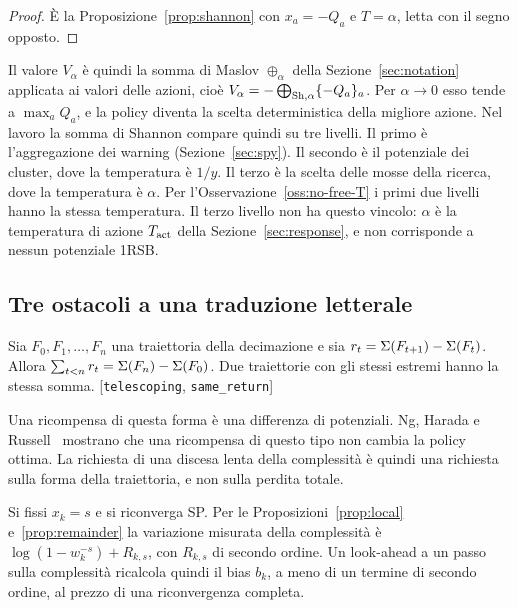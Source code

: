 \begin{proof}
È la Proposizione~\ref{prop:shannon} con $x_a=-Q_a$ e $T=\alpha$, letta con il segno opposto.
\end{proof}

Il valore $V_\alpha$ è quindi la somma di Maslov $\oplus_\alpha$ della Sezione~\ref{sec:notation} applicata ai valori delle azioni, cioè $V_\alpha=-\bigoplus_{\mathrm{Sh},\alpha}\{-Q_a\}_a$.
Per $\alpha\to0$ esso tende a $\max_aQ_a$, e la policy diventa la scelta deterministica della migliore azione.
Nel lavoro la somma di Shannon compare quindi su tre livelli.
Il primo è l'aggregazione dei warning (Sezione~\ref{sec:spy}).
Il secondo è il potenziale dei cluster, dove la temperatura è $1/y$.
Il terzo è la scelta delle mosse della ricerca, dove la temperatura è $\alpha$.
Per l'Osservazione~\ref{oss:no-free-T} i primi due livelli hanno la stessa temperatura.
Il terzo livello non ha questo vincolo: $\alpha$ è la temperatura di azione $T_{\mathrm{act}}$ della Sezione~\ref{sec:response}, e non corrisponde a nessun potenziale 1RSB.

\subsection{Tre ostacoli a una traduzione letterale}

\begin{proposizione}
\label{prop:telescoping}
Sia $F_0,F_1,\dots,F_n$ una traiettoria della decimazione e sia $r_t=\Sigma(F_{t+1})-\Sigma(F_t)$.
Allora $\sum_{t<n}r_t=\Sigma(F_n)-\Sigma(F_0)$.
Due traiettorie con gli stessi estremi hanno la stessa somma.
[\texttt{telescoping}, \texttt{same\_return}]
\end{proposizione}

Una ricompensa di questa forma è una differenza di potenziali.
Ng, Harada e Russell~\citep{ng1999policy} mostrano che una ricompensa di questo tipo non cambia la policy ottima.
La richiesta di una discesa lenta della complessità è quindi una richiesta sulla forma della traiettoria, e non sulla perdita totale.

\begin{osservazione}
\label{oss:one-step}
Si fissi $x_k=s$ e si riconverga SP.
Per le Proposizioni~\ref{prop:local} e~\ref{prop:remainder} la variazione misurata della complessità è $\log(1-w_k^{-s})+R_{k,s}$, con $R_{k,s}$ di secondo ordine.
Un look-ahead a un passo sulla complessità ricalcola quindi il bias $b_k$, a meno di un termine di secondo ordine, al prezzo di una riconvergenza completa.
\end{osservazione}

